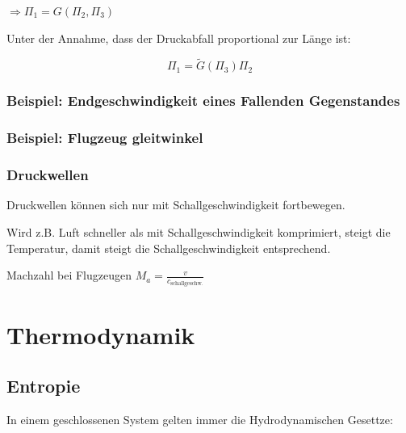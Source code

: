 \documentclass[a4paper]{scrartcl}
\begin{document}
	$\Rightarrow \Pi_1 = G(\Pi_2, \Pi_3)$
	
	Unter der Annahme, dass der Druckabfall proportional zur Länge ist:
	
	\[
		\Pi_1 = \tilde{G}(\Pi_3)\Pi_2
	\]
	


\subsubsection{Beispiel: Endgeschwindigkeit eines Fallenden Gegenstandes}

\subsubsection{Beispiel: Flugzeug gleitwinkel}


\subsubsection{Druckwellen}
	Druckwellen können sich nur mit Schallgeschwindigkeit fortbewegen.
	
	Wird z.B. Luft schneller als mit Schallgeschwindigkeit komprimiert, steigt die Temperatur, damit steigt die Schallgeschwindigkeit entsprechend.
	
	Machzahl bei Flugzeugen $M_a = \frac{v}{c_{\text{schallgeschw.}}}$



























\section{Thermodynamik}
\subsection{Entropie}

In einem geschlossenen System gelten immer die Hydrodynamischen Gesettze:
\end{document}
